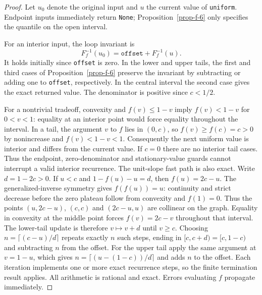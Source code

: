 \documentclass{article}
\begin{document}
\begin{proof}
Let $u_0$ denote the original input and $u$ the current value of
\texttt{uniform}. Endpoint inputs immediately return \texttt{None};
Proposition~\ref{prop-f-6} only specifies the quantile on the open interval.

For an interior input, the loop invariant is
\[
    F_f^{-1}(u_0)=\texttt{offset}+F_f^{-1}(u).
\]
It holds initially since \texttt{offset} is zero.
In the lower and upper tails, the first and third cases of
Proposition~\ref{prop-f-6} preserve the invariant by subtracting or
adding one to \texttt{offset}, respectively.
In the central interval the second case gives the exact returned value.
The denominator is positive since $c<1/2$.

For a nontrivial tradeoff, convexity and $f(v)\leq1-v$ imply
$f(v)<1-v$ for $0<v<1$: equality at an interior point would force
equality throughout the interval.
In a tail, the argument $v$ to $f$ lies in $(0,c)$, so
$f(v)\geq f(c)=c>0$ by nonincrease and $f(v)<1-v<1$.
Consequently the next uniform value is interior and differs from the
current value. If $c=0$ there are no interior tail cases.
Thus the endpoint, zero-denominator and stationary-value guards
cannot interrupt a valid interior recurrence.
The unit-slope fast path is also exact. Write $d=1-2c>0$.
If $u<c$ and $1-f(u)-u=d$, then $f(u)=2c-u$.
The generalized-inverse symmetry gives $f(f(u))=u$: continuity and
strict decrease before the zero plateau follow from convexity and
$f(1)=0$. Thus the points $(u,2c-u)$, $(c,c)$ and $(2c-u,u)$
are collinear on the graph. Equality in convexity at the middle point
forces $f(v)=2c-v$ throughout that interval.
The lower-tail update is therefore $v\mapsto v+d$ until $v\geq c$.
Choosing $n=\lceil(c-u)/d\rceil$ repeats exactly $n$ such steps,
ending in $[c,c+d)=[c,1-c)$ and subtracting $n$ from the offset.
For the upper tail apply the same argument at $v=1-u$, which gives
$n=\lceil(u-(1-c))/d\rceil$ and adds $n$ to the offset.
Each iteration implements one or more exact recurrence steps, so the
finite termination result applies. All arithmetic is rational and exact.
Errors evaluating $f$ propagate immediately.

\end{proof}

\printbibliography
\end{document}
